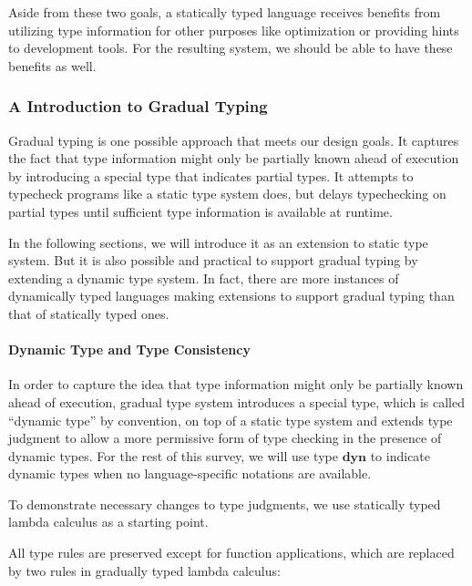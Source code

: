 Aside from these two goals,
a statically typed language receives benefits from
utilizing type information for other purposes like
optimization or providing hints to development tools.
For the resulting system, we should be able to have these benefits as well.

\subsubsection{A Introduction to Gradual Typing}

\newcommand{\dyn}{\textbf{dyn}}

Gradual typing \cite{siek2006gradual} is one possible approach that meets our design goals.
It captures the fact that type information might only be partially known
ahead of execution by introducing a special type that indicates partial types.
It attempts to typecheck programs like a static type system does, but delays
typechecking on partial types until sufficient type information is available
at runtime.

In the following sections, we will introduce it
as an extension to static type system.
But it is also possible and practical to support gradual typing by
extending a dynamic type system.
In fact, there are more instances of dynamically typed languages
making extensions to support gradual typing than that of statically typed ones.

\paragraph{Dynamic Type and Type Consistency}

In order to capture the idea that type information might only be partially known
ahead of execution, gradual type system introduces a special type, 
which is called ``dynamic type'' by convention, on top of a static type system
and extends type judgment to allow a more permissive form of type checking in the presence
of dynamic types. For the rest of this survey,
we will use type $\dyn$ to indicate dynamic types
when no language-specific notations are available.

To demonstrate necessary changes to type judgments,
we use statically typed lambda calculus as a starting point.

All type rules are preserved except for function applications,
which are replaced by two rules in gradually typed lambda calculus:


